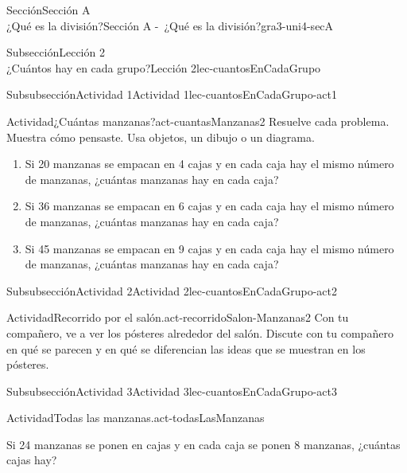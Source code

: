 \begin{sectionptx}{Sección}{{\Large Sección A\\}¿Qué es la división?}{}{Sección A -~¿Qué es la división?}{}{}{gra3-uni4-secA}
\begin{subsectionptx}{Subsección}{{\normalsize Lección 2\\[-0.05cm]}¿Cuántos hay en cada grupo?}{}{Lección 2}{}{}{lec-cuantosEnCadaGrupo}
\typeout{************************************************}
%
\begin{subsubsectionptx}{Subsubsección}{Actividad 1}{}{Actividad 1}{}{}{lec-cuantosEnCadaGrupo-act1}
\begin{activity}{Actividad}{¿Cuántas manzanas?}{act-cuantasManzanas2}%
Resuelve cada problema. Muestra cómo pensaste. Usa objetos, un dibujo o un diagrama.%
\par
%
\begin{enumerate}
\item{}Si 20 manzanas se empacan en 4 cajas y en cada caja hay el mismo número de manzanas, ¿cuántas manzanas hay en cada caja?%
\item{}Si 36 manzanas se empacan en 6 cajas y en cada caja hay el mismo número de manzanas, ¿cuántas manzanas hay en cada caja?%
\item{}Si 45 manzanas se empacan en 9 cajas y en cada caja hay el mismo número de manzanas, ¿cuántas manzanas hay en cada caja?%
\end{enumerate}
%
\end{activity}%
\end{subsubsectionptx}
%
%
\typeout{************************************************}
\typeout{************************************************}
%
\begin{subsubsectionptx}{Subsubsección}{Actividad 2}{}{Actividad 2}{}{}{lec-cuantosEnCadaGrupo-act2}
\begin{activity}{Actividad}{Recorrido por el salón.}{act-recorridoSalon-Manzanas2}%
Con tu compañero, ve a ver los pósteres alrededor del salón. Discute con tu compañero en qué se parecen y en qué se diferencian las ideas que se muestran en los pósteres.%
\end{activity}%
\end{subsubsectionptx}
%
%
\typeout{************************************************}
\typeout{************************************************}
%
\begin{subsubsectionptx}{Subsubsección}{Actividad 3}{}{Actividad 3}{}{}{lec-cuantosEnCadaGrupo-act3}
\begin{activity}{Actividad}{Todas las manzanas.}{act-todasLasManzanas}%
\begin{sidebyside}{2}{0.05}{0.05}{0.1}%
\begin{sbspanel}{0.4}%
Si 24 manzanas se ponen en cajas y en cada caja se ponen 8 manzanas, ¿cuántas cajas hay?%
\end{sbspanel}%

\end{sidebyside}
\end{activity}
\end{subsubsectionptx}
\end{subsectionptx}
\end{sectionptx}
